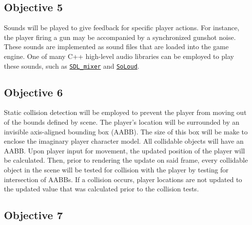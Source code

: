 \documentclass {article}
\begin{document}

\subsection{Objective 5}
Sounds will be played to give feedback for specific player actions. For instance, the player firing a gun may be accompanied by a synchronized gunshot noise. These sounds are implemented as sound files that are loaded into the game engine. One of many C++ high-level audio libraries can be employed to play these sounds, such as \href{https://github.com/libsdl-org/SDL\_mixer}{\texttt{SDL\_mixer}} and \href{https://solhsa.com/soloud/}{\texttt{SoLoud}}.


\subsection{Objective 6}
Static collision detection will be employed to prevent the player from moving out of the bounds defined by scene. The player's location will be surrounded by an invisible axis-aligned bounding box (AABB). The size of this box will be make to enclose the imaginary player character model. All collidable objects will have an AABB. Upon player input for movement, the updated position of the player will be calculated. Then, prior to rendering the update on said frame, every collidable object in the scene will be tested for collision with the player by testing for intersection of AABBs. If a collision occurs, player locations are not updated to the updated value that was calculated prior to the collision tests.

\subsection{Objective 7}

\end{document}
